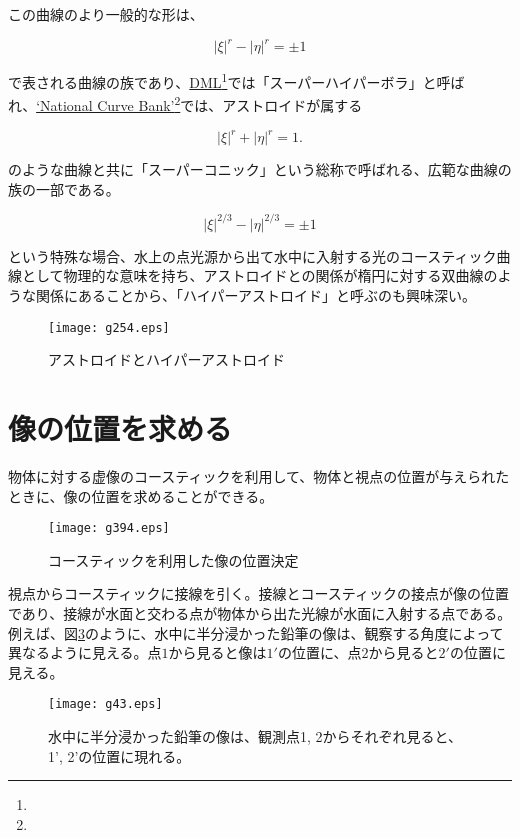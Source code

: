 \documentclass[twocolumn]{article}
\begin{document}
	この曲線のより一般的な形は、
	
	$$ \left| \xi \right|^{r} - \left| \eta \right|^{r} = \pm1 $$
	
	で表される曲線の族であり、\href{http://dynamicmathematicslearning.com/super-ellipse.html}{DML}\footnote{}では「スーパーハイパーボラ」と呼ばれ、\href{https://old.nationalcurvebank.org/superconicncb/superconicncbb.htm}{`National Curve Bank'}\footnote{}では、アストロイドが属する
	
	$$ \left| \xi \right|^{r} + \left| \eta \right|^{r} = 1. $$
	
	のような曲線と共に「スーパーコニック」という総称で呼ばれる、広範な曲線の族の一部である。
	
	$$ \left| \xi \right|^{2/3} - \left| \eta \right|^{2/3} = \pm1 $$
	
	という特殊な場合、水上の点光源から出て水中に入射する光のコースティック曲線として物理的な意味を持ち、アストロイドとの関係が楕円に対する双曲線のような関係にあることから、「ハイパーアストロイド」と呼ぶのも興味深い。
	
	\begin{figure}
		\centering
		\texttt{[image: g254.eps]}
		\caption{アストロイドとハイパーアストロイド}
		\label{fig:hyperastroid}
	\end{figure}
	
	\section{像の位置を求める}
	
	物体に対する虚像のコースティックを利用して、物体と視点の位置が与えられたときに、像の位置を求めることができる。
	
	\begin{figure}[ht]
		\centering
		\texttt{[image: g394.eps]}
		\caption{コースティックを利用した像の位置決定}
		\label{fig:image_caustic}
	\end{figure}
	
	視点からコースティックに接線を引く。接線とコースティックの接点が像の位置であり、接線が水面と交わる点が物体から出た光線が水面に入射する点である。
	例えば、図\ref{fig:pencil_view}のように、水中に半分浸かった鉛筆の像は、観察する角度によって異なるように見える。点$1$から見ると像は$1'$の位置に、点$2$から見ると$2'$の位置に見える。
	
	\begin{figure}[ht]
		\centering
		\texttt{[image: g43.eps]}
		\caption{水中に半分浸かった鉛筆の像は、観測点1, 2からそれぞれ見ると、1', 2'の位置に現れる。}
		\label{fig:pencil_view}
	\end{figure}
	
\end{document}

